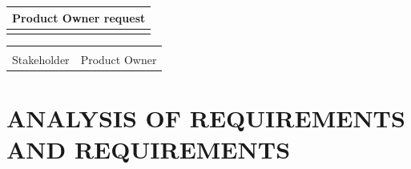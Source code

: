 \documentclass{article}
\begin{document}
\begin{center}
	\begin{tabular}[t]{|p{17cm}| }
		\hline
		\rowcolor[HTML]{98B5C6} \textbf{Product Owner request}\\[0.03cm]
		\hline
		\textbf{}\\[6cm]
		\hline
		
	\end{tabular}
\end{center}

\vfill
\noindent\begin{tabular}{ll}
	\makebox[2.5in]{\hrulefill} & \makebox[2.5in]{\hrulefill}\\
	\hspace*{0mm}\phantom{Approved: }Stakeholder & \hspace*{0mm}\phantom{Approved: }Product Owner
\end{tabular}

\section{ANALYSIS OF REQUIREMENTS AND REQUIREMENTS}
\end{document}
